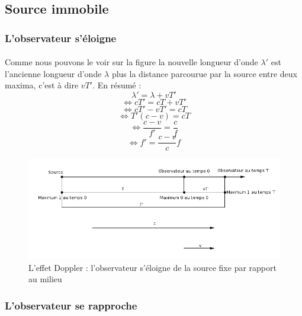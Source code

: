 \documentclass[a4paper]{article}
\begin{document}
\subsection{Source immobile}
\subsubsection{L'observateur s'éloigne}
\paragraph{}Comme nous pouvons le voir sur la figure la nouvelle longueur d'onde $\lambda'$ est l'ancienne longueur d'onde $\lambda$ plus la distance parcourue par la source entre deux maxima, c'est à dire $vT'$. En résumé :
\[\lambda'=\lambda+vT'\]
\[\Leftrightarrow cT'=cT+vT'\]
\[\Leftrightarrow cT'-vT'=cT\]
\[\Leftrightarrow T'(c-v)=cT\]
\[\Leftrightarrow \frac{c-v}{f'}=\frac{c}{f}\]
\[\Leftrightarrow f'=\frac{c-v}{c}f\]
\begin{figure}
\begin{center}
\includegraphics[width=15cm]{imgs/SfOe.png}
\end{center}
\caption{L'effet Doppler : l'observateur s'éloigne de la source fixe par rapport au milieu}
\label{L'effet Doppler : l'observateur s'éloigne de la source fixe par rapport au milieu}
\end{figure}
\subsubsection{L'observateur se rapproche}
\end{document}
